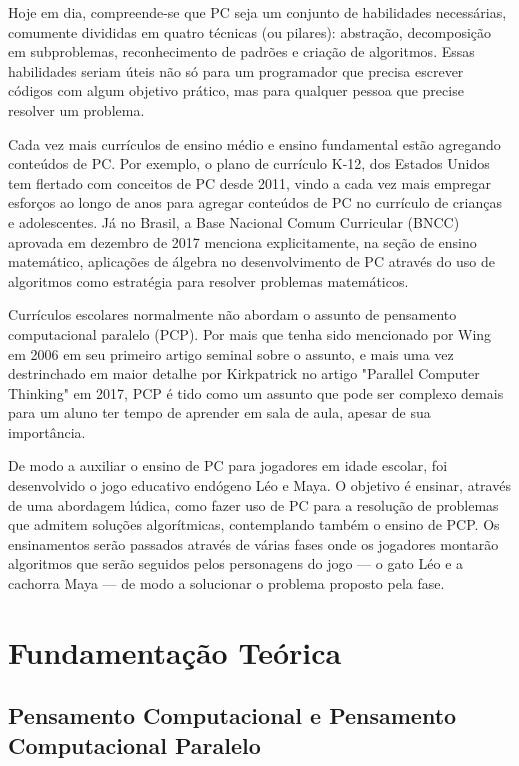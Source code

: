 \documentclass[conference]{IEEEtran}
\begin{document}
Hoje em dia, compreende-se que PC seja um conjunto de habilidades necessárias, comumente divididas em quatro técnicas (ou pilares): abstração, decomposição em subproblemas, reconhecimento de padrões e criação de algoritmos\cite{b3}. Essas habilidades seriam úteis não só para um programador que precisa escrever códigos com algum objetivo prático, mas para qualquer pessoa que precise resolver um problema.

Cada vez mais currículos de ensino médio e ensino fundamental estão agregando conteúdos de PC. Por exemplo, o plano de currículo K-12, dos Estados Unidos tem flertado com conceitos de PC desde 2011\cite{b1}, vindo a cada vez mais empregar esforços ao longo de anos para agregar conteúdos de PC no currículo de crianças e adolescentes. Já no Brasil, a Base Nacional Comum Curricular (BNCC) aprovada em dezembro de 2017 menciona explicitamente, na seção de ensino matemático, aplicações de álgebra no desenvolvimento de PC através do uso de algoritmos como estratégia para resolver problemas matemáticos\cite{b4}.

Currículos escolares normalmente não abordam o assunto de pensamento computacional paralelo (PCP). Por mais que tenha sido mencionado por Wing em 2006 em seu primeiro artigo seminal sobre o assunto, e mais uma vez destrinchado em maior detalhe por Kirkpatrick no artigo "Parallel Computer Thinking" em 2017, PCP é tido como um assunto que pode ser complexo demais para um aluno ter tempo de aprender em sala de aula, apesar de sua importância\cite{b5}. 

De modo a auxiliar o ensino de PC para jogadores em idade escolar,  foi desenvolvido o jogo educativo endógeno Léo e Maya.  O objetivo é ensinar, através de uma abordagem lúdica, como fazer uso de PC para a resolução de problemas que admitem soluções algorítmicas, contemplando também o ensino de PCP. Os ensinamentos serão passados através de várias fases onde os jogadores montarão algoritmos que serão seguidos pelos personagens do jogo — o gato Léo e a cachorra Maya — de modo a solucionar o problema proposto pela fase.

\section{Fundamentação Teórica}

\subsection{Pensamento Computacional e Pensamento Computacional Paralelo}
\end{document}
